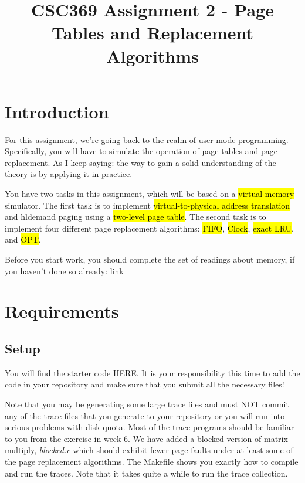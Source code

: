 \documentclass[12pt]{article}
\begin{document}
\title{CSC369 Assignment 2 - Page Tables and Replacement Algorithms}
\maketitle

\bigskip

\section{Introduction}

\bigskip

For this assignment, we're going back to the realm of user mode programming.
Specifically, you will have to simulate the operation of page tables and page
replacement. As I keep saying: the way to gain a solid understanding of the theory
is by applying it in practice.

\bigskip

\noindent You have two tasks in this assignment, which will be based on a \hl{virtual memory}
simulator. The first task is to implement \hl{virtual-to-physical address translation}
and hl{demand paging} using a \hl{two-level page table}. The second task is to implement
four different page replacement algorithms: \hl{FIFO}, \hl{Clock}, \hl{exact LRU}, and \hl{OPT}.

\bigskip

\noindent Before you start work, you should complete the set of readings about memory, if
you haven't done so already: \href{http://pages.cs.wisc.edu/~remzi/OSTEP/vm-paging.pdf}{link}

\bigskip

\section{Requirements}

\bigskip

\subsection{Setup}

\bigskip

\noindent You will find the starter code HERE. It is your responsibility this time to add
the code in your repository and make sure that you submit all the necessary files!

\noindent Note that you may be generating some large trace files and must NOT commit any of
the trace files that you generate to your repository or you will run into serious
problems with disk quota. Most of the trace programs should be familiar to you from
the exercise in week 6. We have added a blocked version of matrix multiply, \textit{blocked.c}
which should exhibit fewer page faults under at least some of the page replacement
algorithms. The Makefile shows you exactly how to compile and run the traces. Note
that it takes quite a while to run the trace collection.
\end{document}
